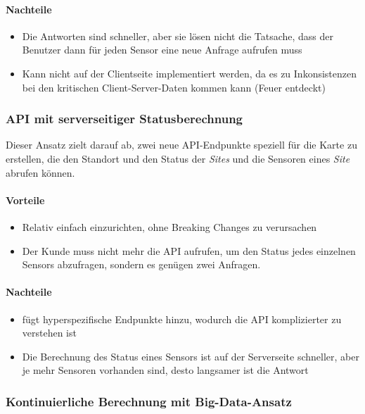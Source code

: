 \paragraph{Nachteile}
\begin{itemize}
  \item Die Antworten sind schneller, aber sie lösen nicht die Tatsache, dass der Benutzer dann für jeden Sensor eine neue Anfrage aufrufen muss
  \item Kann nicht auf der Clientseite implementiert werden, da es zu Inkonsistenzen bei den kritischen Client-Server-Daten kommen kann (Feuer entdeckt)
\end{itemize}

\subsubsection{API mit serverseitiger Statusberechnung} \label{sec:API_serverseitiger_Statusberechnung}

Dieser Ansatz zielt darauf ab, zwei neue API-Endpunkte speziell für die Karte zu erstellen, die den Standort und den Status der \textit{Sites} und die Sensoren eines \textit{Site} abrufen können.

\paragraph{Vorteile}
\begin{itemize}
  \item Relativ einfach einzurichten, ohne Breaking Changes zu verursachen
  \item Der Kunde muss nicht mehr die API aufrufen, um den Status jedes einzelnen Sensors abzufragen, sondern es genügen zwei Anfragen.
\end{itemize}

\paragraph{Nachteile}
\begin{itemize}
  \item fügt hyperspezifische Endpunkte hinzu, wodurch die API komplizierter zu verstehen ist
  \item Die Berechnung des Status eines Sensors ist auf der Serverseite schneller, aber je mehr Sensoren vorhanden sind, desto langsamer ist die Antwort
\end{itemize}

\subsubsection{Kontinuierliche Berechnung mit Big-Data-Ansatz} \label{sec:API_bigdata}

